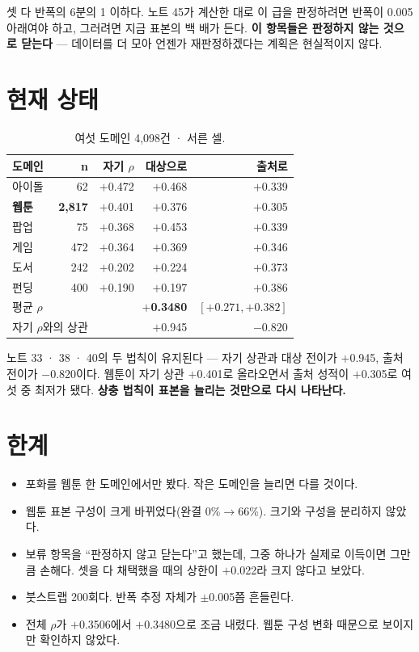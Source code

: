 \documentclass[10pt]{article}
\begin{document}
셋 다 반폭의 6분의 1 이하다. 노트 45가 계산한 대로 이 급을 판정하려면 반폭이
0.005 아래여야 하고, 그러려면 지금 표본의 백 배가 든다. \textbf{이 항목들은
판정하지 않는 것으로 닫는다} --- 데이터를 더 모아 언젠가 재판정하겠다는 계획은
현실적이지 않다.

\section{현재 상태}

\begin{table}[t]
\centering\tsize
\caption{여섯 도메인 4,098건 · 서른 셀.}
\begin{tabular}{lrrrr}
\toprule
도메인 & n & 자기 $\rho$ & 대상으로 & 출처로 \\
\midrule
아이돌 & 62 & $+$0.472 & $+$0.468 & $+$0.339 \\
\textbf{웹툰} & \textbf{2,817} & $+$0.401 & $+$0.376 & $+$0.305 \\
팝업 & 75 & $+$0.368 & $+$0.453 & $+$0.339 \\
게임 & 472 & $+$0.364 & $+$0.369 & $+$0.346 \\
도서 & 242 & $+$0.202 & $+$0.224 & $+$0.373 \\
펀딩 & 400 & $+$0.190 & $+$0.197 & $+$0.386 \\
\midrule
\multicolumn{2}{l}{평균 $\rho$} & \multicolumn{2}{r}{\textbf{$+$0.3480}} &
$[+0.271, +0.382]$ \\
\multicolumn{2}{l}{자기 $\rho$와의 상관} & & $+$0.945 & $-$0.820 \\
\bottomrule
\end{tabular}
\end{table}

노트 33 · 38 · 40의 두 법칙이 유지된다 --- 자기 상관과 대상 전이가 $+$0.945,
출처 전이가 $-$0.820이다. 웹툰이 자기 상관 $+$0.401로 올라오면서 출처 성적이
$+$0.305로 여섯 중 최저가 됐다. \textbf{상충 법칙이 표본을 늘리는 것만으로
다시 나타난다.}

\section{한계}

\begin{itemize}[leftmargin=1.1em,itemsep=0.15em]
\item 포화를 웹툰 한 도메인에서만 봤다. 작은 도메인을 늘리면 다를 것이다.
\item 웹툰 표본 구성이 크게 바뀌었다(완결 0\%$\to$66\%). 크기와 구성을 분리하지
      않았다.
\item 보류 항목을 ``판정하지 않고 닫는다''고 했는데, 그중 하나가 실제로 이득이면
      그만큼 손해다. 셋을 다 채택했을 때의 상한이 $+$0.022라 크지 않다고 보았다.
\item 붓스트랩 200회다. 반폭 추정 자체가 $\pm$0.005쯤 흔들린다.
\item 전체 $\rho$가 $+$0.3506에서 $+$0.3480으로 조금 내렸다. 웹툰 구성 변화
      때문으로 보이지만 확인하지 않았다.
\end{itemize}
\end{document}
